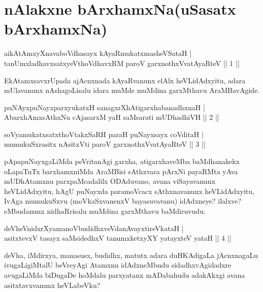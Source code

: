 
\section*{nAlakxne bArxhamxNa(uSasatx bArxhamxNa)}

\begin{shl}
aikAtAmxyXnavaboVdhasayx kAyaRmukatxmasheVSataH |\\
tanUmxladhavxsatxyeV\s thoVdhavxRM paroV garxnothxV\s vatAyaRteV \hfill || 1 ||
\end{shl}

\begin{artha}
EkAtamxsavxrUpada ajAcnxnada kAyaRvanunx elAlx heVLidAdxyitu, adara mUlavanunx nAshagoLisalu idara muMde muMdina garxMthavu AraMBavAgide.
\end{artha}

\begin{shl}
puNAyxpuNayxparxyukatxH sanagxrXhAtigarxhabanadhxnaH |\\
AbarxhAmx\s \s sAthxNu cAjasarxM yaH saMsarati mUDhadhiVH \hfill || 2 ||
\end{shl}

\begin{shl}
soV\s yamukatxsatxthoVtakxSaRH paraH puNayxsayx coVditaH |\\
mumukuSxrasitx nAsitxVti paroV garxnothxV\s vatAyaRteV \hfill || 3 ||
\end{shl}

\begin{artha}
pApapuNayxgaLiMda peVritanAgi garxha, atigarxhaveMba baMdhanakekx oLapaTuTx barxhamxniMda AraMBisi sAthxvara pArxNi payaRMta yAva mUDhAtamxnu parxpaMcadalilx ODAduvano, avana viSayavanunx heVLidAdxyitu, hAgU puNayxda paramoVcacx sAthxnavanunx heVLidAdxyitu, IvAga mumukuSxvu (moVkaSxvanenxV bayasuvavanu) idAdxneye? ilalxve? eMbudanunx nidhaRrisalu muMdina garxMthavu baMdiruvudu.
\end{artha}


\begin{shl}
deVheVnidxrXyamanoVbudidhxveVdanAvayxtireVkataH |\\
asitxtevxV tasayx saMsidedhxV tanumxketxyXY yatayxteV yataH \hfill || 4 ||
\end{shl}

\begin{artha}
deVha, iMdirxya, manasusx, budidhx, matutx adara duHKAdigaLa jAcnxnagaLu ivugaLigiMtalU beVreyAgi Atamxnu idAdxneMbudu sidadhxvAgidadxre avugaLiMda biDugaDe hoMdalu parxyatanx mADabahudu adakAkxgi avana asitxtavxvanunx heVLabeVku?
\end{artha}

